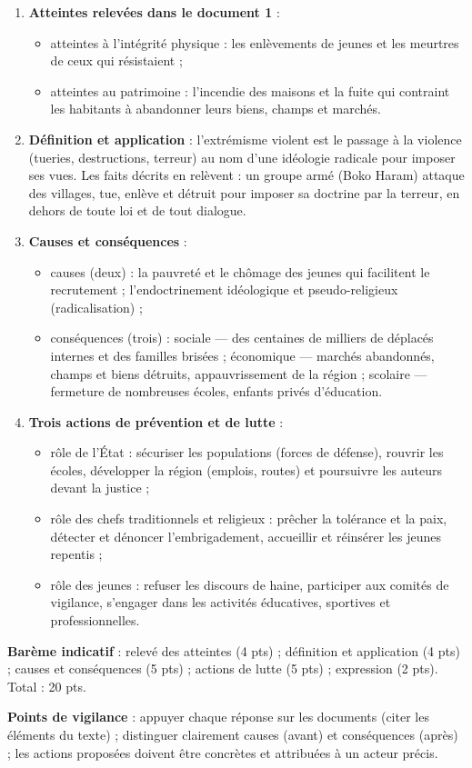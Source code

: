 \documentclass[11pt]{article}
\newcommand{\cle}[1]{{\popxbold\color{popdark}#1}}
\begin{document}
\begin{corrige}
\begin{enumerate}
\item \textbf{Atteintes relevées dans le document 1} :
\begin{itemize}
\item atteintes à l'intégrité physique : les \cle{enlèvements} de jeunes et les \cle{meurtres} de ceux qui résistaient ;
\item atteintes au patrimoine : l'\cle{incendie des maisons} et la fuite qui contraint les habitants à abandonner leurs biens, champs et marchés.
\end{itemize}
\item \textbf{Définition et application} : l'\cle{extrémisme violent} est le passage à la violence (tueries, destructions, terreur) au nom d'une idéologie radicale pour imposer ses vues. Les faits décrits en relèvent : un groupe armé (Boko Haram) attaque des villages, tue, enlève et détruit pour imposer sa doctrine par la terreur, en dehors de toute loi et de tout dialogue.
\item \textbf{Causes et conséquences} :
\begin{itemize}
\item causes (deux) : la pauvreté et le chômage des jeunes qui facilitent le recrutement ; l'endoctrinement idéologique et pseudo-religieux (radicalisation) ;
\item conséquences (trois) : sociale — des centaines de milliers de \cle{déplacés internes} et des familles brisées ; économique — marchés abandonnés, champs et biens détruits, appauvrissement de la région ; scolaire — fermeture de nombreuses écoles, enfants privés d'éducation.
\end{itemize}
\item \textbf{Trois actions de prévention et de lutte} :
\begin{itemize}
\item rôle de l'État : sécuriser les populations (forces de défense), rouvrir les écoles, développer la région (emplois, routes) et poursuivre les auteurs devant la justice ;
\item rôle des chefs traditionnels et religieux : prêcher la tolérance et la paix, détecter et dénoncer l'embrigadement, accueillir et réinsérer les jeunes repentis ;
\item rôle des jeunes : refuser les discours de haine, participer aux comités de vigilance, s'engager dans les activités éducatives, sportives et professionnelles.
\end{itemize}
\end{enumerate}
\textbf{Barème indicatif} : relevé des atteintes (4 pts) ; définition et application (4 pts) ; causes et conséquences (5 pts) ; actions de lutte (5 pts) ; expression (2 pts). Total : 20 pts.

\textbf{Points de vigilance} : appuyer chaque réponse sur les documents (citer les éléments du texte) ; distinguer clairement causes (avant) et conséquences (après) ; les actions proposées doivent être concrètes et attribuées à un acteur précis.
\end{corrige}
\end{document}
